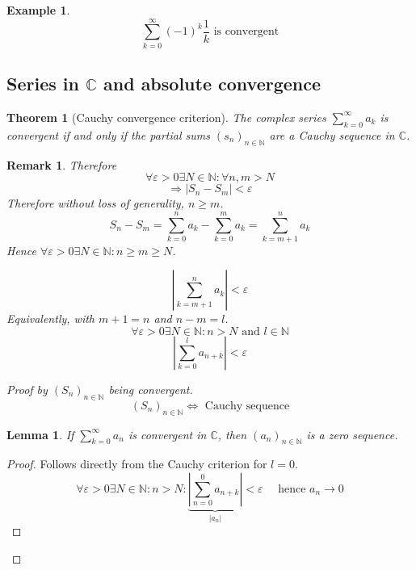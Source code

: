 \documentclass[a4paper,landscape,twocolumn]{article}
\newtheorem{theorem}{Theorem}
\newtheorem{rem}{Remark}
\newtheorem{ex}{Example}
\newtheorem{lemma}{Lemma}
\newcommand\abs[1]{\left|#1\right|}
\newcommand\seq[1]{{\left(#1\right)}_{n \in \mathbb N}}
\begin{document}
\begin{ex}
  \[ \sum_{k=0}^\infty (-1)^{k} \frac{1}{k} \text{ is convergent} \]
\end{ex}

\subsection{Series in $\mathbb C$ and absolute convergence}
%
\begin{theorem}[Cauchy convergence criterion]
  The complex series $\sum_{k=0}^{\infty} a_k$ is convergent if and only if
  the partial sums $\seq{s_n}$ are a Cauchy sequence in $\mathbb C$. %
\end{theorem}
\begin{rem}
  Therefore
  \[ \forall \varepsilon > 0 \exists N \in \mathbb N: \forall n,m > N \]
  \[ \Rightarrow \abs{S_n - S_m} < \varepsilon \]
  Therefore without loss of generality, $n \geq m$.
  \[ S_n - S_m = \sum_{k=0}^n a_k - \sum_{k=0}^m a_k = \sum_{k=m+1}^n a_k \]
  Hence $\forall \varepsilon > 0 \exists N \in \mathbb N: n \geq m \geq N$.

  \[ \abs{\sum_{k=m+1}^n a_k} < \varepsilon \]
  Equivalently, with $m + 1 = n$ and $n - m = l$.
  \[ \forall \varepsilon > 0 \exists N \in \mathbb N: n > N \text{ and } l \in \mathbb N \]
  \[ \abs{\sum_{k=0}^l a_{n+k}} < \varepsilon \]
\end{rem}
\begin{proof}[Proof by $\seq{S_n}$ being convergent]
  \[ \seq{S_n} \Leftrightarrow \text{ Cauchy sequence} \]

  \begin{lemma}
    If $\sum_{k=0}^{\infty} a_n$ is convergent in $\mathbb C$, then $\seq{a_n}$ is a zero sequence.
  \end{lemma}
  \begin{proof}
    Follows directly from the Cauchy criterion for $l = 0$.
    \[
      \forall \varepsilon > 0 \exists N \in \mathbb N: n > N:
      \underbrace{\abs{\sum_{n=0}^0 a_{n+k}}}_{\abs{a_n}} < \varepsilon
      \quad \text{ hence } a_n \to 0
    \]
  \end{proof}
\end{proof}
\end{document}
